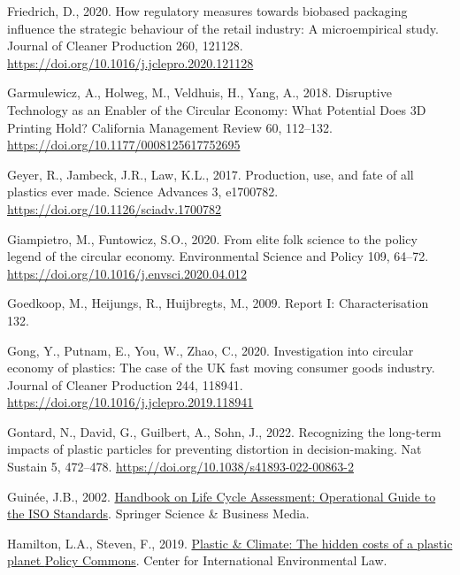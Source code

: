 \documentclass[12pt]{elsarticle} %
\newlength{\cslhangindent}
\newlength{\cslentryspacingunit} %
\newenvironment{CSLReferences}[2] %
 {%
  \setlength{\parindent}{0pt}
  \ifodd #1
  \let\oldpar\par
  \def\par{\hangindent=\cslhangindent\oldpar}
  \fi
  \setlength{\parskip}{#2\cslentryspacingunit}
 }%
 {}
\begin{document}
\begin{CSLReferences}{1}{0}
\leavevmode{}%
Friedrich, D., 2020. How regulatory measures towards biobased packaging influence the strategic behaviour of the retail industry: {A} microempirical study. Journal of Cleaner Production 260, 121128. \url{https://doi.org/10.1016/j.jclepro.2020.121128}

\leavevmode{}%
Garmulewicz, A., Holweg, M., Veldhuis, H., Yang, A., 2018. Disruptive {Technology} as an {Enabler} of the {Circular Economy}: {What Potential Does 3D Printing Hold}? California Management Review 60, 112--132. \url{https://doi.org/10.1177/0008125617752695}

\leavevmode{}%
Geyer, R., Jambeck, J.R., Law, K.L., 2017. Production, use, and fate of all plastics ever made. Science Advances 3, e1700782. \url{https://doi.org/10.1126/sciadv.1700782}

\leavevmode{}%
Giampietro, M., Funtowicz, S.O., 2020. From elite folk science to the policy legend of the circular economy. Environmental Science and Policy 109, 64--72. \url{https://doi.org/10.1016/j.envsci.2020.04.012}

\leavevmode{}%
Goedkoop, M., Heijungs, R., Huijbregts, M., 2009. Report {I}: {Characterisation} 132.

\leavevmode{}%
Gong, Y., Putnam, E., You, W., Zhao, C., 2020. Investigation into circular economy of plastics: {The} case of the {UK} fast moving consumer goods industry. Journal of Cleaner Production 244, 118941. \url{https://doi.org/10.1016/j.jclepro.2019.118941}

\leavevmode{}%
Gontard, N., David, G., Guilbert, A., Sohn, J., 2022. Recognizing the long-term impacts of plastic particles for preventing distortion in decision-making. Nat Sustain 5, 472--478. \url{https://doi.org/10.1038/s41893-022-00863-2}

\leavevmode{}%
Guinée, J.B., 2002. \href{https://books.google.com?id=Q1VYuV5vc8UC}{Handbook on {Life Cycle Assessment}: {Operational Guide} to the {ISO Standards}}. {Springer Science \& Business Media}.

\leavevmode{}%
Hamilton, L.A., Steven, F., 2019. \href{https://policycommons.net/artifacts/2485040/untitled/3507468/}{Plastic \& {Climate}: {The} hidden costs of a plastic planet \textbar{} {Policy Commons}}. {Center for International Environmental Law}.


\end{CSLReferences}
\end{document}
